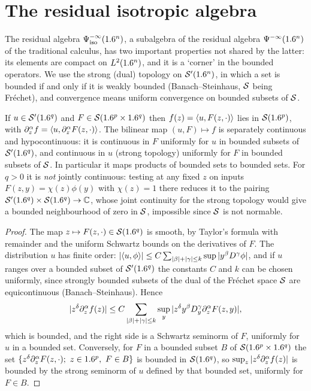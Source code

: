 \section{The residual isotropic algebra}\label{isotropic:sec:residual}

The residual algebra $\Psi^{-\infty}_{\mathrm{iso}}(1.6^n)$, a subalgebra of the residual
algebra $\Psi^{-\infty}(1.6^n)$ of the traditional calculus, has two important
properties not shared by the latter: its elements are compact on $L^2(1.6^n)$,
and it is a `corner' in the bounded operators. We use the strong (dual)
topology on $\mathcal{S}'(1.6^n)$, in which a set is bounded if and only if it is
weakly bounded (Banach--Steinhaus, $\mathcal{S}$ being Fréchet), and convergence means
uniform convergence on bounded subsets of $\mathcal{S}$.

\begin{lemma}\label{isotropic:lem:partial-pairing}
If $u\in\mathcal{S}'(1.6^q)$ and $F\in\mathcal{S}(1.6^p\times1.6^q)$ then
$f(z)=\langle u, F(z,\cdot)\rangle$ lies in $\mathcal{S}(1.6^p)$, with
$\partial_z^\alpha f=\langle u, \partial_z^\alpha F(z,\cdot)\rangle$. The bilinear map $(u,F)\mapsto f$
is separately continuous and hypocontinuous: it is continuous in $F$ uniformly
for $u$ in bounded subsets of $\mathcal{S}'(1.6^q)$, and continuous in $u$ (strong
topology) uniformly for $F$ in bounded subsets of $\mathcal{S}$. In particular it maps
products of bounded sets to bounded sets. For $q>0$ it is \emph{not} jointly
continuous: testing at any fixed $z$ on inputs $F(z,y)=\chi(z)\phi(y)$ with
$\chi(z)=1$ there reduces it to the pairing $\mathcal{S}'(1.6^q)\times\mathcal{S}(1.6^q)\to\mathbb{C}$, whose joint
continuity for the strong topology would give a bounded neighbourhood
of zero in $\mathcal{S}$, impossible since $\mathcal{S}$ is not normable.
\end{lemma}
\begin{proof}
The map $z\mapsto F(z,\cdot)\in\mathcal{S}(1.6^q)$ is smooth, by Taylor's formula with
remainder and the uniform Schwartz bounds on the derivatives of $F$. The
distribution $u$ has finite order:
$|\langle u, \phi\rangle|\le C\sum_{|\beta|+|\gamma|\le k}\sup|y^\beta D^\gamma\phi|$, and if
$u$ ranges over a bounded subset of $\mathcal{S}'(1.6^q)$ the constants $C$ and $k$ can
be chosen uniformly, since strongly bounded subsets of the dual of the
Fréchet space $\mathcal{S}$ are equicontinuous (Banach--Steinhaus). Hence
\begin{equation*}
  |z^\delta\partial_z^\alpha f(z)|\le C\sum_{|\beta|+|\gamma|\le k}\sup_y|z^\delta y^\beta D_y^\gamma\partial_z^\alpha F(z,y)|,
\end{equation*}
which is bounded, and the right side is a Schwartz seminorm of $F$, uniformly
for $u$ in a bounded set. Conversely, for $F$ in a bounded subset $B$ of
$\mathcal{S}(1.6^p\times1.6^q)$ the set $\{z^\delta\partial_z^\alpha F(z,\cdot);\ z\in1.6^p,\ F\in B\}$ is
bounded in $\mathcal{S}(1.6^q)$, so
$\sup_z|z^\delta\partial_z^\alpha f(z)|$ is bounded by the strong seminorm of $u$
defined by that bounded set, uniformly for $F\in B$.
\end{proof}

